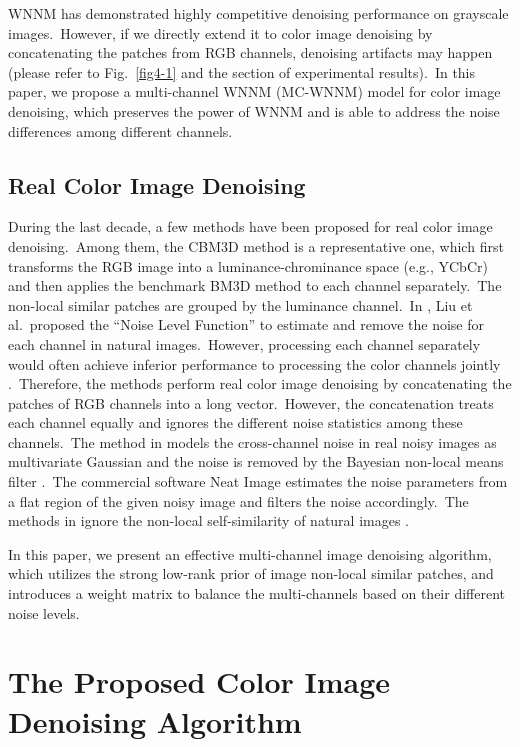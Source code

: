 WNNM has demonstrated highly competitive denoising performance on grayscale images.\ However, if we directly extend it to color image denoising by concatenating the patches from RGB channels, denoising artifacts may happen (please refer to Fig.\ \ref{fig4-1} and the section of experimental results).\ In this paper, we propose a multi-channel WNNM (MC-WNNM) model for color image denoising, which preserves the power of WNNM and is able to address the noise differences among different channels.

\subsection{Real Color Image Denoising}

During the last decade, a few methods have been proposed for real color image denoising.\ Among them, the CBM3D method \cite{cbm3d} is a representative one, which first transforms the RGB image into a luminance-chrominance space (e.g., YCbCr) and then applies the benchmark BM3D method \cite{bm3d} to each channel separately.\ The non-local similar patches are grouped by the luminance channel.\ In \cite{Liu2008}, Liu et al.\ proposed the ``Noise Level Function'' to estimate and remove the noise for each channel in natural images.\ However, processing each channel separately would often achieve inferior performance to processing the color channels jointly \cite{mairal2008sparse}.\ Therefore, the methods \cite{noiseclinic,ncwebsite,Zhu_2016_CVPR} perform real color image denoising by concatenating the patches of RGB channels into a long vector.\ However, the concatenation treats each channel equally and ignores the different noise statistics among these channels.\ The method in \cite{crosschannel2016} models the cross-channel noise in real noisy images as multivariate Gaussian and the noise is removed by the Bayesian non-local means filter \cite{kervrann2007bayesian}.\ The commercial software Neat Image \cite{neatimage} estimates the noise parameters from a flat region of the given noisy image and filters the noise accordingly.\ The methods in \cite{crosschannel2016,neatimage} ignore the non-local self-similarity of natural images \cite{bm3d,wnnm}. 

In this paper, we present an effective multi-channel image denoising algorithm, which utilizes the strong low-rank prior of image non-local similar patches, and introduces a weight matrix to balance the multi-channels based on their different noise levels.


\section{The Proposed Color Image Denoising Algorithm}

